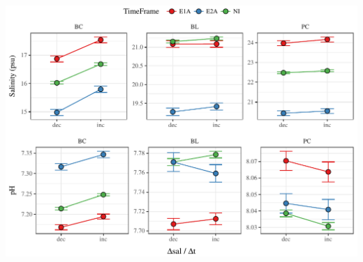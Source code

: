 \documentclass[letterpaper,12pt]{article}\usepackage[]{graphicx}\usepackage[]{color}
\makeatletter
\def\maxwidth{ %
  \ifdim\Gin@nat@width>\linewidth
    \linewidth
  \else
    \Gin@nat@width
  \fi
}
\makeatother
\begin{document}
{\centering \includegraphics[width=\maxwidth]{figs/Fig7} 

}




\clearpage

\end{document}
